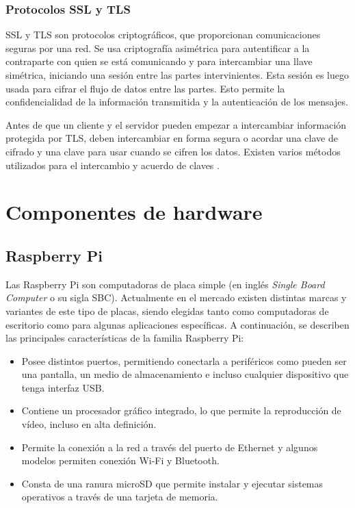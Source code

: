 \subsubsection{Protocolos SSL y TLS}

SSL y TLS son protocolos criptográficos, que proporcionan comunicaciones seguras por una red. Se usa criptografía asimétrica para autentificar a la contraparte con quien se está comunicando y para intercambiar una llave simétrica, iniciando una sesión entre las partes intervinientes. Esta sesión es luego usada para cifrar el flujo de datos entre las partes. Esto permite la confidencialidad de la información transmitida y la autenticación de los mensajes. 

Antes de que un cliente y el servidor pueden empezar a intercambiar información protegida por TLS, deben intercambiar en forma segura o acordar una clave de cifrado y una clave para usar cuando se cifren los datos. Existen varios métodos utilizados para el intercambio y acuerdo de claves \citep{11}.

\section{Componentes de hardware}

\subsection{Raspberry Pi}

Las Raspberry Pi son computadoras de placa simple (en inglés \textit{Single Board Computer} o su sigla SBC). Actualmente en el mercado existen distintas marcas y variantes de este tipo de placas, siendo elegidas tanto como computadoras de escritorio como para algunas aplicaciones específicas. A continuación, se describen las principales características de la familia Raspberry Pi:

\begin{itemize}
	\item Posee distintos puertos, permitiendo conectarla a periféricos como pueden ser una pantalla, un medio de almacenamiento e incluso cualquier dispositivo que tenga interfaz USB.
	\item Contiene un procesador gráfico integrado, lo que permite la reproducción de vídeo, incluso en alta definición.
	\item Permite la conexión a la red a través del puerto de Ethernet y algunos modelos permiten conexión Wi-Fi y Bluetooth.
	\item Consta de una ranura microSD que permite instalar y ejecutar sistemas operativos a través de una tarjeta de memoria.
\end{itemize}


